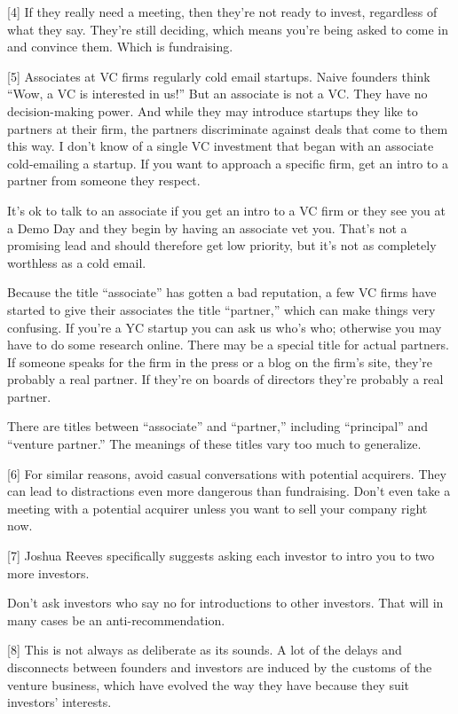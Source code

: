 {[}4{]} If they really need a meeting, then they're not ready to invest,
regardless of what they say. They're still deciding, which means you're
being asked to come in and convince them. Which is fundraising.

{[}5{]} Associates at VC firms regularly cold email startups. Naive
founders think ``Wow, a VC is interested in us!'' But an associate is
not a VC. They have no decision-making power. And while they may
introduce startups they like to partners at their firm, the partners
discriminate against deals that come to them this way. I don't know of a
single VC investment that began with an associate cold-emailing a
startup. If you want to approach a specific firm, get an intro to a
partner from someone they respect.

It's ok to talk to an associate if you get an intro to a VC firm or they
see you at a Demo Day and they begin by having an associate vet you.
That's not a promising lead and should therefore get low priority, but
it's not as completely worthless as a cold email.

Because the title ``associate'' has gotten a bad reputation, a few VC
firms have started to give their associates the title ``partner,'' which
can make things very confusing. If you're a YC startup you can ask us
who's who; otherwise you may have to do some research online. There may
be a special title for actual partners. If someone speaks for the firm
in the press or a blog on the firm's site, they're probably a real
partner. If they're on boards of directors they're probably a real
partner.

There are titles between ``associate'' and ``partner,'' including
``principal'' and ``venture partner.'' The meanings of these titles vary
too much to generalize.

{[}6{]} For similar reasons, avoid casual conversations with potential
acquirers. They can lead to distractions even more dangerous than
fundraising. Don't even take a meeting with a potential acquirer unless
you want to sell your company right now.

{[}7{]} Joshua Reeves specifically suggests asking each investor to
intro you to two more investors.

Don't ask investors who say no for introductions to other investors.
That will in many cases be an anti-recommendation.

{[}8{]} This is not always as deliberate as its sounds. A lot of the
delays and disconnects between founders and investors are induced by the
customs of the venture business, which have evolved the way they have
because they suit investors' interests.

